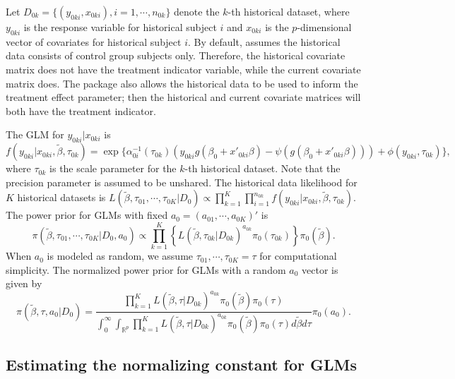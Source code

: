 Let $D_{0k} = \{(y_{0ki}, x_{0ki}), i=1,\cdots, n_{0k}\}$ denote the $k$-th historical dataset, where $y_{0ki}$ is the response variable for historical subject $i$ and $x_{0ki}$ is the $p$-dimensional vector of covariates for historical subject $i$. By default,  assumes the historical data consists of control group subjects only. Therefore, the historical covariate matrix does not have the treatment indicator variable, while the current covariate matrix does. The package also allows the historical data to be used to inform the treatment effect parameter; then the historical and current covariate matrices will both have the treatment indicator. 

The GLM for $y_{0ki}|x_{0ki}$ is $$f(y_{0ki}|x_{0ki}, \tilde{\beta}, \tau_{0k}) = \exp\{\alpha_{0i}^{-1}(\tau_{0k})(y_{0ki}g(\beta_0+x'_{0ki}\beta)-\psi(g(\beta_0+x'_{0ki}\beta))) + \phi(y_{0ki}, \tau_{0k})\},$$ where $\tau_{0k}$ is the scale parameter for the $k$-th historical dataset. Note that the precision parameter is assumed to be unshared. The historical data likelihood for $K$ historical datasets is $L(\tilde{\beta}, \tau_{01}, \cdots, \tau_{0K}|D_0) \propto \prod_{k=1}^{K}\prod_{i=1}^{n_{0k}}f(y_{0ki}|x_{0ki}, \tilde{\beta}, \tau_{0k})$. The power prior for GLMs with fixed $a_0 = (a_{01},\cdots,a_{0K})'$ is $$\pi(\tilde{\beta}, \tau_{01}, \cdots, \tau_{0K}|D_0, a_0) \propto \prod_{k=1}^{K}\left\{L(\tilde{\beta}, \tau_{0k}|D_{0k})^{a_{0k}}\pi_0(\tau_{0k})\right\}\pi_0(\tilde{\beta}).$$ When $a_0$ is modeled as random, we assume $\tau_{01},\cdots,\tau_{0K}=\tau$ for computational simplicity. The normalized power prior for GLMs with a random $a_0$ vector is given by $$\pi(\tilde{\beta}, \tau, a_0|D_0) = \frac{\prod_{k=1}^{K}L(\tilde{\beta}, \tau|D_{0k})^{a_{0k}}\pi_0(\tilde{\beta})\pi_0(\tau)}{\int_0^\infty\int_{\mathbb{R}^p} \prod_{k=1}^{K}L(\tilde{\beta}, \tau|D_{0k})^{a_{0k}}\pi_0(\tilde{\beta})\pi_0(\tau)d\tilde{\beta} d\tau} \pi_0(a_0).$$ 

\subsection*{Estimating the normalizing constant for GLMs}

